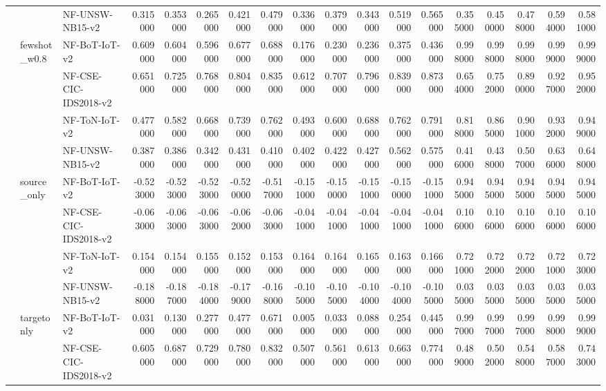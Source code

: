 \begin{tabular}{lllrrrrrrrrrrrrrrr}
 &  & NF-UNSW-NB15-v2 & 0.315000 & 0.353000 & 0.265000 & 0.421000 & 0.479000 & 0.336000 & 0.379000 & 0.343000 & 0.519000 & 0.565000 & 0.355000 & 0.450000 & 0.478000 & 0.594000 & 0.581000 \\
\cline{2-18}
 & \multirow[t]{4}{*}{fewshot_w0.8} & NF-BoT-IoT-v2 & 0.609000 & 0.604000 & 0.596000 & 0.677000 & 0.688000 & 0.176000 & 0.230000 & 0.236000 & 0.375000 & 0.436000 & 0.998000 & 0.998000 & 0.998000 & 0.999000 & 0.999000 \\
 &  & NF-CSE-CIC-IDS2018-v2 & 0.651000 & 0.725000 & 0.768000 & 0.804000 & 0.835000 & 0.612000 & 0.707000 & 0.796000 & 0.839000 & 0.873000 & 0.654000 & 0.752000 & 0.890000 & 0.927000 & 0.952000 \\
 &  & NF-ToN-IoT-v2 & 0.477000 & 0.582000 & 0.668000 & 0.739000 & 0.762000 & 0.493000 & 0.600000 & 0.688000 & 0.762000 & 0.791000 & 0.818000 & 0.865000 & 0.901000 & 0.932000 & 0.949000 \\
 &  & NF-UNSW-NB15-v2 & 0.387000 & 0.386000 & 0.342000 & 0.431000 & 0.410000 & 0.402000 & 0.422000 & 0.427000 & 0.562000 & 0.575000 & 0.416000 & 0.438000 & 0.507000 & 0.636000 & 0.648000 \\
\cline{2-18}
 & \multirow[t]{4}{*}{source_only} & NF-BoT-IoT-v2 & -0.523000 & -0.523000 & -0.523000 & -0.520000 & -0.517000 & -0.151000 & -0.150000 & -0.151000 & -0.150000 & -0.151000 & 0.945000 & 0.945000 & 0.945000 & 0.945000 & 0.945000 \\
 &  & NF-CSE-CIC-IDS2018-v2 & -0.063000 & -0.063000 & -0.063000 & -0.062000 & -0.063000 & -0.041000 & -0.041000 & -0.041000 & -0.041000 & -0.041000 & 0.106000 & 0.106000 & 0.106000 & 0.106000 & 0.106000 \\
 &  & NF-ToN-IoT-v2 & 0.154000 & 0.154000 & 0.155000 & 0.152000 & 0.153000 & 0.164000 & 0.164000 & 0.165000 & 0.163000 & 0.166000 & 0.721000 & 0.722000 & 0.722000 & 0.721000 & 0.723000 \\
 &  & NF-UNSW-NB15-v2 & -0.188000 & -0.187000 & -0.184000 & -0.179000 & -0.168000 & -0.105000 & -0.105000 & -0.104000 & -0.104000 & -0.105000 & 0.035000 & 0.035000 & 0.035000 & 0.035000 & 0.035000 \\
\cline{2-18}
 & \multirow[t]{4}{*}{targetonly} & NF-BoT-IoT-v2 & 0.031000 & 0.130000 & 0.277000 & 0.477000 & 0.671000 & 0.005000 & 0.033000 & 0.088000 & 0.254000 & 0.445000 & 0.997000 & 0.997000 & 0.997000 & 0.998000 & 0.999000 \\
 &  & NF-CSE-CIC-IDS2018-v2 & 0.605000 & 0.687000 & 0.729000 & 0.780000 & 0.832000 & 0.507000 & 0.561000 & 0.613000 & 0.663000 & 0.774000 & 0.489000 & 0.502000 & 0.548000 & 0.587000 & 0.743000 \\

\end{tabular}
